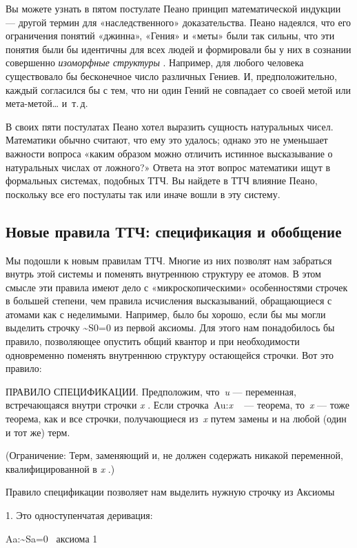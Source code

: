 \documentclass[../main.tex]{subfiles}
\begin{document}
Вы можете узнать в пятом постулате Пеано принцип математической индукции --- другой термин для «наследственного» доказательства. Пеано надеялся, что его ограничения понятий «джинна», «Гения» и «меты» были так сильны, что эти понятия были бы идентичны для всех людей и формировали бы у них в сознании совершенно \emph{изоморфные структуры} . Например, для любого человека существовало бы бесконечное число различных Гениев. И, предположительно, каждый согласился бы с тем, что ни один Гений не совпадает со своей метой или мета-метой\ldots{} и~т.\,д.

В своих пяти постулатах Пеано хотел выразить сущность натуральных чисел. Математики обычно считают, что ему это удалось; однако это не уменьшает важности вопроса «каким образом можно отличить истинное высказывание о натуральных числах от ложного?» Ответа на этот вопрос математики ищут в формальных системах, подобных ТТЧ. Вы найдете в ТТЧ влияние Пеано, поскольку все его постулаты так или иначе вошли в эту систему.


\subsection{Новые правила ТТЧ: спецификация и обобщение}

Мы подошли к новым правилам ТТЧ. Многие из них позволят нам забраться внутрь этой системы и поменять внутреннюю структуру ее атомов. В этом смысле эти правила имеют дело с «микроскопическими» особенностями строчек в большей степени, чем правила исчисления высказываний, обращающиеся с атомами как с неделимыми. Например, было бы хорошо, если бы мы могли выделить строчку \textasciitilde S0=0 из первой аксиомы. Для этого нам понадобилось бы правило, позволяющее опустить общий квантор и при необходимости одновременно поменять внутреннюю структуру остающейся строчки. Вот это правило:

ПРАВИЛО СПЕЦИФИКАЦИИ. Предположим, что~\emph{u} --- переменная, встречающаяся внутри строчки \emph{x} . Если строчка~Au:\emph{x} ~ --- теорема, то~\emph{x} --- тоже теорема, как и все строчки, получающиеся из~\emph{x} путем замены и на любой (один и тот же) терм.

(Ограничение: Терм, заменяющий и, не должен содержать никакой переменной, квалифицированной в \emph{x} .)

Правило спецификации позволяет нам выделить нужную строчку из Аксиомы

1. Это одноступенчатая деривация:

Aa:\textasciitilde Sa=0~ аксиома 1
\end{document}
